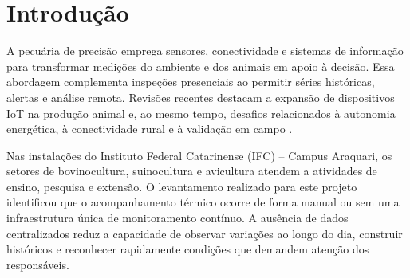 \documentclass[10pt,a4paper,twocolumn]{article}
\newcommand{\englishkeywords}[1]{\noindent\textbf{Keywords:} #1}
\begin{document}
\begin{abstract}
\noindent
Continuous monitoring of environmental conditions in animal production
facilities can support management, research, and early detection of thermal
discomfort. However, spatially distributed barns and battery-powered devices make
conventional networks difficult to deploy. This paper presents a
LoRaWAN-based Internet of Things infrastructure for monitoring temperature and,
where applicable, relative humidity in cattle, swine, and poultry facilities at
Instituto Federal Catarinense, Araquari Campus. This is an applied, exploratory,
and design-oriented study. Environmental requirements, research on agricultural
LoRa networks, and the technical artifacts produced in a Network Project course
were analyzed. The solution specifies six Dragino LHT65N-DC sensors, a Dragino
LPS8N gateway, \SI{915}{\mega\hertz} communication, managed AWS services, and a
web application. Its data flow covers acquisition, transmission, storage,
historical visualization, and alerts. The proposal combines low-power sensing,
long-range communication, centralized data, separated ingestion and storage
services, identity-based security, and scalability. These qualities can reduce
manual inspections, accelerate responses to thermal deviations, and provide
historical data for management, teaching, and research. The estimated initial
cost is BRL~2,977.00. Since a complete physical deployment was not performed,
performance values remain acceptance targets rather than experimental results.

\medskip
\englishkeywords{LoRaWAN; Internet of Things; environmental monitoring; precision livestock farming; sensor networks.}
\end{abstract}

\section{Introdução}

A pecuária de precisão emprega sensores, conectividade e sistemas de informação
para transformar medições do ambiente e dos animais em apoio à decisão. Essa
abordagem complementa inspeções presenciais ao permitir séries históricas,
alertas e análise remota. Revisões recentes destacam a expansão de dispositivos
IoT na produção animal e, ao mesmo tempo, desafios relacionados à autonomia
energética, à conectividade rural e à validação em campo \cite{alves2025}.

Nas instalações do Instituto Federal Catarinense (IFC) -- Campus Araquari, os
setores de bovinocultura, suinocultura e avicultura atendem a atividades de
ensino, pesquisa e extensão. O levantamento realizado para este projeto
identificou que o acompanhamento térmico ocorre de forma manual ou sem uma
infraestrutura única de monitoramento contínuo. A ausência de dados centralizados reduz a capacidade
de observar variações ao longo do dia, construir históricos e reconhecer
rapidamente condições que demandem atenção dos responsáveis.
\end{document}
